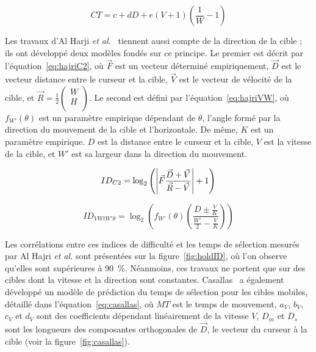 	\begin{equation}
		\label{eq:jagacinski}
		CT = c + dD + e(V + 1) \left(\frac{1}{W} - 1\right)
	\end{equation}
	
	Les travaux d'Al Harji \emph{et al.}~\cite{hajri2011moving} tiennent aussi compte de la direction de la cible ; ils ont développé deux modèles fondés sur ce principe. Le premier est décrit par l'équation~\ref{eq:hajriC2}, où $\vec{F}$ est un vecteur déterminé empiriquement, $\vec{D}$ est le vecteur distance entre le curseur et la cible, $\vec{V}$ est le vecteur de vélocité de la cible, et $\vec{R} = \frac{1}{2} \begin{pmatrix}
	W \\ H \\
\end{pmatrix}$. Le second est défini par l'équation~\ref{eq:hajriVW}, où $f_{W'}(\theta)$ est un paramètre empirique dépendant de $\theta$, l'angle formé par la direction du mouvement de la cible et l'horizontale. De même, $K$ est un paramètre empirique. $D$ est la distance entre le curseur et la cible, $V$ est la vitesse de la cible, et $W'$ est sa largeur dans la direction du mouvement.
	
	\begin{equation}
		\label{eq:hajriC2}
		ID_{C2} = \log_{2}\left(\abs*{\vec{F} \frac{\vec{D}+\vec{V}}{\vec{R}-\vec{V}}} + 1 \right)
	\end{equation}
	
	\begin{equation}
		\label{eq:hajriVW}
		ID_{VWtW'\theta} = \log_{2}\left( f_{W'}(\theta) \left( \frac{D \pm \frac{V}{K}}{\frac{W'}{2} - \frac{V}{K}} \right) \right)
	\end{equation}
	
	Les corrélations entre ces indices de difficulté et les temps de sélection mesurés par Al Hajri \emph{et al.} sont présentées sur la figure~\ref{fig:holdID}, où l'on observe qu'elles sont supérieures à 90~\%{}. Néanmoins, ces travaux ne portent que sur des cibles dont la vitesse et la direction sont constantes. Casallas~\cite{casallas2015prediction} a également développé un modèle de prédiction du temps de sélection pour les cibles mobiles, détaillé dans l'équation~\ref{eq:casallas}, où $MT$ est le temps de mouvement, $a_{V}$, $b_{V}$, $c_{V}$ et $d_{V}$ sont des coefficients dépendant linéairement de la vitesse $V$, $D_{m}$ et $D_{s}$ sont les longueurs des composantes orthogonales de $\vec{D}$, le vecteur du curseur à la cible (voir la figure~\ref{fig:casallas}).
	
